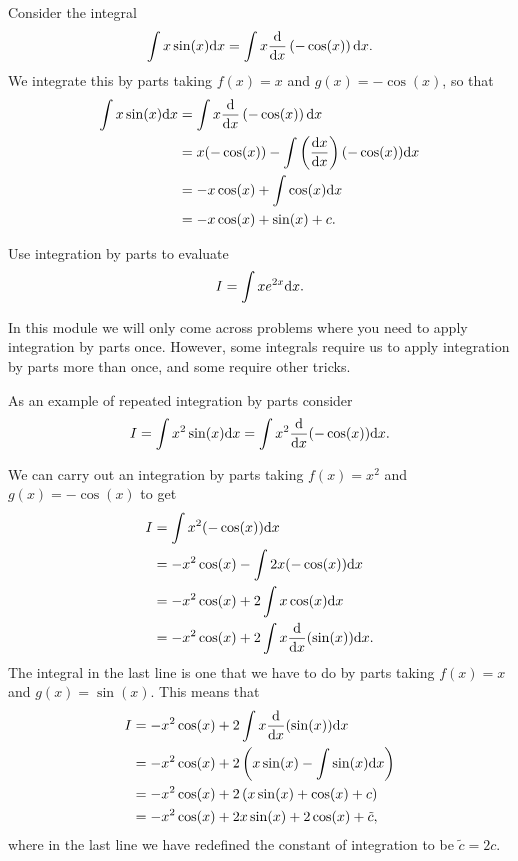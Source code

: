 \begin{ex}
Consider the integral
\begin{equation*}
\int x\sin(x)\mathrm{d} x =\int x\frac{\mathrm{d}}{\mathrm{d} x}\left(-\cos(x)\right)\mathrm{d} x.
\end{equation*}
We integrate this by parts taking $f(x)=x$ and $g(x)=-\cos(x)$, so that
\begin{align*}
\int x\sin(x)\mathrm{d} x 	&=\int x\frac{\mathrm{d}}{\mathrm{d} x}\left(-\cos(x)\right)\mathrm{d} x\\
				&=x(-\cos(x))-\int\left(\frac{\mathrm{d} x}{\mathrm{d} x}\right)(-\cos(x))\mathrm{d} x\\
				&=-x\cos(x)+\int \cos(x)\mathrm{d} x\\
				&=-x\cos(x)+\sin(x)+c.
\end{align*}
\end{ex}

\begin{exercise}
Use integration by parts to evaluate 
\begin{equation*}
I=\int x e^{2x}\mathrm{d} x.
\end{equation*}
\end{exercise}

In this module we will only come across problems where you need to apply integration by parts once. However, some integrals require us to apply integration by parts more than once, and some require other tricks.

\begin{mdiv}
As an example of repeated integration by parts consider
\begin{equation*}
I=\int x^{2}\sin(x)\mathrm{d} x=\int x^{2}\frac{\mathrm{d}}{\mathrm{d} x}(-\cos(x))\mathrm{d} x.
\end{equation*}

We can carry out an integration by parts taking $f(x)=x^{2}$ and $g(x)=-\cos(x)$ to get
\begin{align*}
I 	&=\int x^{2}(-\cos(x))\mathrm{d} x\\
	&=-x^{2}\cos(x)-\int 2x(-\cos(x))\mathrm{d} x\\
	&=-x^{2}\cos(x)+2\int x\cos(x)\mathrm{d} x\\
	&=-x^{2}\cos(x)+2\int x\frac{\mathrm{d}}{\mathrm{d} x}(\sin(x))\mathrm{d} x.
\end{align*}
The integral in the last line is one that we have to do by parts taking $f(x)=x$ and $g(x)=\sin(x)$. This means that
\begin{align*}
I 	&=-x^{2}\cos(x)+2\int x\frac{\mathrm{d}}{\mathrm{d} x}(\sin(x))\mathrm{d} x\\
	&=-x^{2}\cos(x)+2\left(x\sin(x)-\int \sin(x)\mathrm{d} x\right)\\
	&=-x^{2}\cos(x)+2\left(x\sin(x)+\cos(x)+c\right)\\
	&=-x^{2}\cos(x)+2x\sin(x)+2\cos(x)+\tilde{c},
\end{align*}
where in the last line we have redefined the constant of integration to be $\tilde{c}=2c$.
\end{mdiv}

